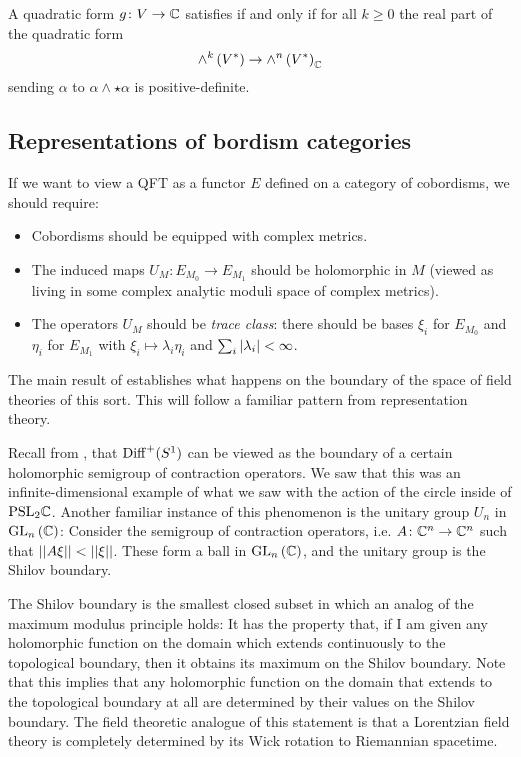 \begin{thm}[\cite{KS}]
A quadratic form $g \colon V \to \mathbb{C}$ 
satisfies  if and only if for all $k\geq 0$ the real part of
the quadratic form
\begin{equation*}
\wedge^k\left(V^*\right)  \to \wedge^n\left(V^*\right)_{\mathbb{C}}
\end{equation*}
sending $\alpha$ to $\alpha \wedge \star \alpha$ is positive-definite.
\end{thm}


\subsection{Representations of bordism categories}

If we want to view a QFT as a functor $E$ defined on a category of cobordisms, we should
require:
\begin{itemize}
\item Cobordisms should be equipped with complex metrics.
\item The induced maps $U_M \colon E_{M_0} \to E_{M_1}$ should be holomorphic in $M$ 
(viewed as living in some complex analytic moduli space of complex metrics).
\item The operators $U_M$ should be \emph{trace class}: 
there should be bases $\xi_i$ for $E_{M_0}$ and $\eta_i$ for $E_{M_1}$ with 
$\xi_i \mapsto \lambda_i \eta_i$ and $\sum_i \left|{\lambda_i}\right| < \infty$.
\end{itemize}

The main result of \cite{KS} establishes what happens on the boundary of the space of
field theories of this sort. This will follow a familiar pattern from representation
theory.

Recall from , that $\operatorname{Diff}^+(S^1)$ can be viewed as the
boundary of a certain holomorphic semigroup of contraction operators. 
We saw that this was an infinite-dimensional example of what we saw with the action of the
circle inside of $\mathrm{PSL}_2 \mathbb{C}$. 
Another familiar instance of this phenomenon is the unitary group $U_n$ in
$\mathrm{GL}_n\left(\mathbb{C}\right)$:
Consider the semigroup of contraction operators, i.e. $A \colon \mathbb{C}^n \to \mathbb{C}^n$ such that
$\left|\left|{A\xi}\right|\right| < \left|\left|{\xi}\right|\right|$. 
These form a ball in $\mathrm{GL}_n\left(\mathbb{C}\right)$, and the unitary group is the Shilov
boundary. 

The Shilov boundary is the smallest closed subset in which an 
analog of the maximum modulus principle holds:
It has the property that, 
if I am given any holomorphic function on the domain which extends continuously to the
topological boundary, then it obtains its maximum on the Shilov boundary. 
Note that this implies that any holomorphic function on the domain that extends to
the topological boundary at all are determined by their values on the Shilov boundary. 
The field theoretic analogue of this statement is that a Lorentzian field theory is 
completely determined by its Wick rotation to Riemannian spacetime. 

